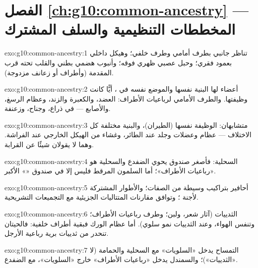 \section*{الفصل \ref{ch:g10:common-ancestry} --- المخططات التنظيمية والسلف المشترك}

\begin{solution}{exo:g10:common-ancestry:1}
تناظر جانبي بطرف أمامي وطرف خلفي؛ وهيكل داخلي بعمود فقري؛ وحبل عصبي
ظهري فوقه؛ وأنبوب هضمي بطني والقلب تحته قرب المقدمة (وأطراف أو زعانف
مزدوجة).
\end{solution}

\begin{solution}{exo:g10:common-ancestry:2}
أعضاء لها البنية نفسها والموضع نفسه في ، أيًّا كانت
وظيفتها. والطرف الأمامي لرباعيات الأطراف: العضد، والكعبرة والزند،
وعظام الرسغ، والأصابع --- في ذراع، وجناح، وزعنفة.
\end{solution}

\begin{solution}{exo:g10:common-ancestry:3}
متشابهان: الوظيفة نفسها (الطيران)، والبنية مختلفة كل الاختلاف ---
عظام وعضلات وجلد عند الطائر، وغشاء من الهيكل الخارجي عند الفراشة.
وهما لا يقولان شيئًا عن القرابة.
\end{solution}

\begin{solution}{exo:g10:common-ancestry:4}
السحلية: فأصغر صندوق يحوي الضفدع والسحلية هو «رباعيات الأطراف»؛ أما
السلمون المرقط فليس إلا في صندوق «» الأكبر.
\end{solution}

\begin{solution}{exo:g10:common-ancestry:5}
أحافير بتراكيب وسيطة من الصفات؛ والأطوار المشتركة لأجنة ؛
وتوافق مقارنات المتتاليات الجزيئية مع التجميعات التشريحية.
\end{solution}

\begin{solution}{exo:g10:common-ancestry:6}
الثدييات (آثار شعر، ولبن؛ وطرف رباعيات الأطراف؛ وتنفس الهواء، وعند
الثدييات نمو سلوي). أما عظام الورك فبقية أطراف خلفية: فالحيتان تنحدر
من ثدييات برية رباعية الأرجل.
\end{solution}

\begin{solution}{exo:g10:common-ancestry:7}
التمساح يدخل «السلويات» مع السحلية والحمامة (لا «الثدييات»)؛ والسمندل
يدخل «رباعيات الأطراف» خارج «السلويات»، مع الضفدع.
\end{solution}

